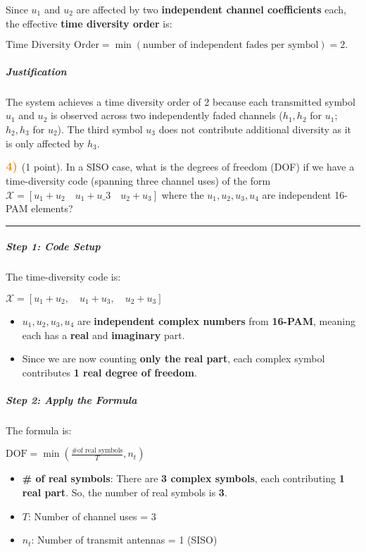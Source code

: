 \documentclass[11pt]{article}
\providecommand{\tightlist}{%
      \setlength{\itemsep}{0pt}\setlength{\parskip}{0pt}}
\begin{document}
Since \(u_1\) and \(u_2\) are affected by two \textbf{independent
channel coefficients} each, the effective \textbf{time diversity order}
is:

\(\text{Time Diversity Order} = \min(\text{number of independent fades per symbol}) = \boxed{2}.\)

\subparagraph{Justification}\label{justification}

The system achieves a time diversity order of 2 because each transmitted
symbol \(u_1\) and \(u_2\) is observed across two independently faded
channels (\(h_1, h_2\) for \(u_1\); \(h_2, h_3\) for \(u_2\)). The third
symbol \(u_3\) does not contribute additional diversity as it is only
affected by \(h_3\).

    \(\color{orange} \large \textbf{4)}\) (1 point). In a SISO case, what is
the degrees of freedom (DOF) if we have a time-diversity code (spanning
three channel uses) of the form
\(\mathcal{X} = {[u_1 + u_2 \quad u_1 + u\_3 \quad u_2 + u_3]}\) where
the \(u_1,u_2,u_3,u_4\) are independent 16-PAM elements?

    \begin{center}\rule{0.5\linewidth}{0.5pt}\end{center}

\subparagraph{\texorpdfstring{\textbf{Step 1: Code
Setup}}{Step 1: Code Setup}}\label{step-1-code-setup}

The time-diversity code is:

\(\mathcal{X} = [u_1 + u_2, \quad u_1 + u_3, \quad u_2 + u_3]\)

\begin{itemize}
\tightlist
\item
  \(u_1, u_2, u_3, u_4\) are \textbf{independent complex numbers} from
  \textbf{16-PAM}, meaning each has a \textbf{real} and
  \textbf{imaginary} part.
\item
  Since we are now counting \textbf{only the real part}, each complex
  symbol contributes \textbf{1 real degree of freedom}.
\end{itemize}

\subparagraph{\texorpdfstring{\textbf{Step 2: Apply the
Formula}}{Step 2: Apply the Formula}}\label{step-2-apply-the-formula}

The formula is:

\(\text{DOF} = \min\left( \frac{\text{\# of real symbols}}{T}, n_t \right)\)

\begin{itemize}
\tightlist
\item
  \textbf{\# of real symbols}: There are \textbf{3 complex symbols},
  each contributing \textbf{1 real part}. So, the number of real symbols
  is \textbf{3}.
\item
  \textbf{\(T\)}: Number of channel uses = 3
\item
  \textbf{\(n_t\)}: Number of transmit antennas = 1 (SISO)
\end{itemize}
\end{document}
